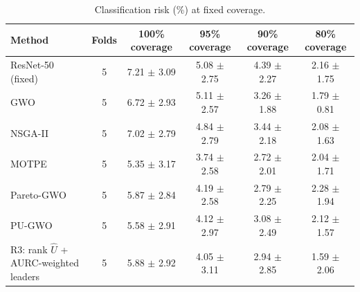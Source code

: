 \begin{table}[t]
\centering
\caption{Classification risk (\%) at fixed coverage.}
\label{tab:table5_risk_at_coverage}
\small
\begin{tabular}{lccccc}
\toprule
Method & Folds & 100\% coverage & 95\% coverage & 90\% coverage & 80\% coverage \\
\midrule
ResNet-50 (fixed) & 5 & 7.21 $\pm$ 3.09 & 5.08 $\pm$ 2.75 & 4.39 $\pm$ 2.27 & 2.16 $\pm$ 1.75 \\
GWO & 5 & 6.72 $\pm$ 2.93 & 5.11 $\pm$ 2.57 & 3.26 $\pm$ 1.88 & 1.79 $\pm$ 0.81 \\
NSGA-II & 5 & 7.02 $\pm$ 2.79 & 4.84 $\pm$ 2.79 & 3.44 $\pm$ 2.18 & 2.08 $\pm$ 1.63 \\
MOTPE & 5 & 5.35 $\pm$ 3.17 & 3.74 $\pm$ 2.58 & 2.72 $\pm$ 2.01 & 2.04 $\pm$ 1.71 \\
Pareto-GWO & 5 & 5.87 $\pm$ 2.84 & 4.19 $\pm$ 2.58 & 2.79 $\pm$ 2.25 & 2.28 $\pm$ 1.94 \\
PU-GWO & 5 & 5.58 $\pm$ 2.91 & 4.12 $\pm$ 2.97 & 3.08 $\pm$ 2.49 & 2.12 $\pm$ 1.57 \\
R3: rank $\hat{U}$ + AURC-weighted leaders & 5 & 5.88 $\pm$ 2.92 & 4.05 $\pm$ 3.11 & 2.94 $\pm$ 2.85 & 1.59 $\pm$ 2.06 \\
\bottomrule
\end{tabular}
\end{table}
